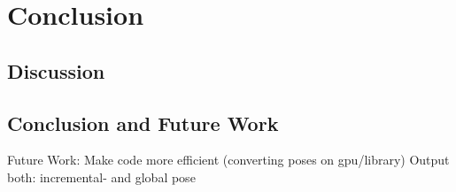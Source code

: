 \chapter{Conclusion}


\section{Discussion}

\section{Conclusion and Future Work}

Future Work: Make code more efficient (converting poses on gpu/library)
Output both: incremental- and global pose